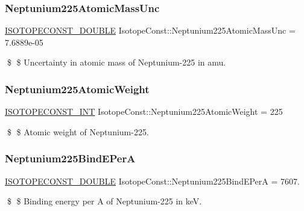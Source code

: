 \subsubsection{\texorpdfstring{Neptunium225\+Atomic\+Mass\+Unc}{Neptunium225AtomicMassUnc}}
{\footnotesize\ttfamily \mbox{\hyperlink{group___isotope_const-_macros_ga8f45a7272ce02c0b4c65c44636ed719a}{I\+S\+O\+T\+O\+P\+E\+C\+O\+N\+S\+T\+\_\+\+D\+O\+U\+B\+LE}} Isotope\+Const\+::\+Neptunium225\+Atomic\+Mass\+Unc = 7.\+6889e-\/05}

\$ \$ Uncertainty in atomic mass of Neptunium-\/225 in amu. \mbox{\label{group___isotope_const-_neptunium-_np225_ga377d24939e42e1693a275f7dbd970fe7}} 
\subsubsection{\texorpdfstring{Neptunium225\+Atomic\+Weight}{Neptunium225AtomicWeight}}
{\footnotesize\ttfamily \mbox{\hyperlink{group___isotope_const-_macros_ga5f18360b3e99483a35c32d789e62621c}{I\+S\+O\+T\+O\+P\+E\+C\+O\+N\+S\+T\+\_\+\+I\+NT}} Isotope\+Const\+::\+Neptunium225\+Atomic\+Weight = 225}

\$ \$ Atomic weight of Neptunium-\/225. \mbox{\label{group___isotope_const-_neptunium-_np225_gabb2d5d3767e4b3371af095872bf289d2}} 
\subsubsection{\texorpdfstring{Neptunium225\+Bind\+E\+PerA}{Neptunium225BindEPerA}}
{\footnotesize\ttfamily \mbox{\hyperlink{group___isotope_const-_macros_ga8f45a7272ce02c0b4c65c44636ed719a}{I\+S\+O\+T\+O\+P\+E\+C\+O\+N\+S\+T\+\_\+\+D\+O\+U\+B\+LE}} Isotope\+Const\+::\+Neptunium225\+Bind\+E\+PerA = 7607.}

\$ \$ Binding energy per A of Neptunium-\/225 in keV. \mbox{\label{group___isotope_const-_neptunium-_np225_ga7c1926d88d4a1a98690c5823deda3338}} 

